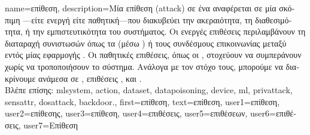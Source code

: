 {name={\foreignlanguage{greek}{επίθεση}},
	description={\foreignlanguage{greek}{Μία επίθεση} (attack)  \foreignlanguage{greek}{σε ένα}
		 \foreignlanguage{greek}{αναφέρεται σε μία σκόπιμη} —\foreignlanguage{greek}{είτε 
		ενεργή είτε παθητική—που διακυβεύ\-ει την ακεραιότητα, τη διαθεσιμότητα, ή την εμπιστευτικότητα του συστήματος. 
		Οι ενεργές επιθέσεις περιλαμβάνουν τη διαταραχή συνιστωσών όπως τα}  (\foreignlanguage{greek}{μέσω} 
		) \foreignlanguage{greek}{ή τους συνδέσμους επικοινωνίας μεταξύ}  
		\foreignlanguage{greek}{εντός μίας εφαρμογής} . \foreignlanguage{greek}{Οι παθητικές επιθέσεις, όπως οι} 
		, \foreignlanguage{greek}{στοχεύουν να συμπεράνουν}  \foreignlanguage{greek}{χωρίς 
		να τροποποιήσουν το σύστημα. Ανάλογα με τον στόχο τους, μπορούμε να διακρίνουμε ανάμεσα σε} , 
		\foreignlanguage{greek}{επιθέσεις} , \foreignlanguage{greek}{και} .
		\\
		\foreignlanguage{greek}{Βλέπε επίσης:} \gls{mlsystem}, \gls{action}, \gls{dataset}, \gls{datapoisoning}, \gls{device}, \gls{ml}, 
		\gls{privattack}, \gls{sensattr}, \gls{dosattack}, \gls{backdoor}.},
	first={\foreignlanguage{greek}{επίθεση}},
	text={\foreignlanguage{greek}{επίθεση}},
	user1={\foreignlanguage{greek}{επίθεση}}, %
  	user2={\foreignlanguage{greek}{επίθεσης}}, %
	user3={\foreignlanguage{greek}{επίθεση}}, %
  	user4={\foreignlanguage{greek}{επιθέσεις}}, %
	user5={\foreignlanguage{greek}{επιθέσεων}}, %
  	user6={\foreignlanguage{greek}{επιθέσεις}}, %
	user7={\foreignlanguage{greek}{Επίθεση}} %
}

